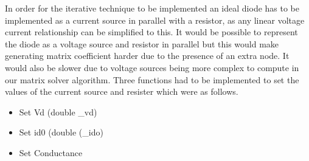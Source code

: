 \documentclass{article}
\begin{document}
In order for the iterative technique to be implemented an ideal diode has to be implemented as a current source in parallel with a resistor, as any linear voltage current relationship can be simplified to this. It would be possible to represent the diode as a voltage source and resistor in parallel but this would make generating matrix coefficient harder due to the presence of an extra node. It would also be slower due to voltage sources being more complex to compute in our matrix solver algorithm. Three functions had to be implemented to set the values of the current source and resister which were as follows.
\begin{itemize}
    \item Set Vd (double \_vd)
    \item Set id0 (double (\_ido)
    \item Set Conductance
\end{itemize}
\end{document}
